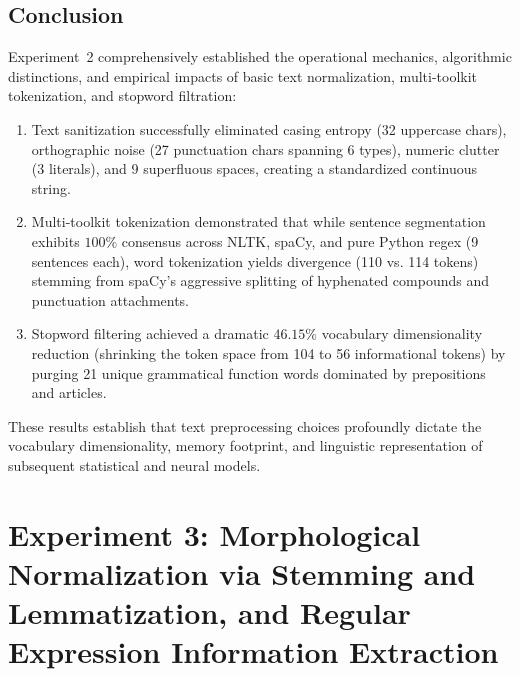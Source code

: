 \documentclass[12pt,a4paper]{report}
\begin{document}
\section{Conclusion}
Experiment~2 comprehensively established the operational mechanics, algorithmic distinctions, and empirical impacts of basic text normalization, multi-toolkit tokenization, and stopword filtration:
\begin{enumerate}
    \item Text sanitization successfully eliminated casing entropy (32 uppercase chars), orthographic noise (27 punctuation chars spanning 6 types), numeric clutter (3 literals), and 9 superfluous spaces, creating a standardized continuous string.
    \item Multi-toolkit tokenization demonstrated that while sentence segmentation exhibits $100\%$ consensus across NLTK, spaCy, and pure Python regex (9 sentences each), word tokenization yields divergence (110 vs. 114 tokens) stemming from spaCy's aggressive splitting of hyphenated compounds and punctuation attachments.
    \item Stopword filtering achieved a dramatic $46.15\%$ vocabulary dimensionality reduction (shrinking the token space from 104 to 56 informational tokens) by purging 21 unique grammatical function words dominated by prepositions and articles.
\end{enumerate}
These results establish that text preprocessing choices profoundly dictate the vocabulary dimensionality, memory footprint, and linguistic representation of subsequent statistical and neural models.



\chapter{Experiment 3: Morphological Normalization via Stemming and Lemmatization, and Regular Expression Information Extraction}
\label{chap:exp3}
\end{document}
